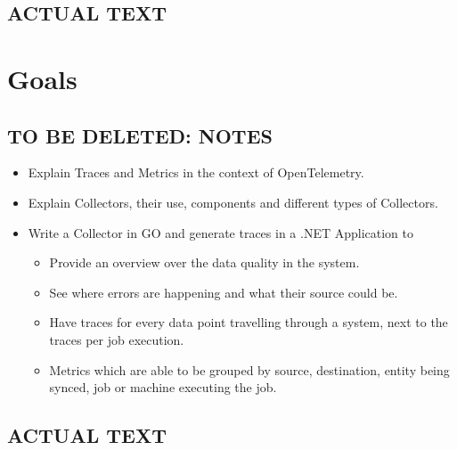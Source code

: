 \subsection{ACTUAL TEXT}

\section{Goals}

\subsection{TO BE DELETED: NOTES}

\begin{itemize}
	\item Explain Traces and Metrics in the context of OpenTelemetry.
	\item Explain Collectors, their use, components and different types of Collectors.
	\item Write a Collector in GO and generate traces in a .NET Application to
	      \begin{itemize}
		      \item Provide an overview over the data quality in the system.
		      \item See where errors are happening and what their source could be.
		      \item Have traces for every data point travelling through a system, next to the traces per job execution.
		      \item Metrics which are able to be grouped by source, destination, entity being synced, job or machine executing the job.
	      \end{itemize}
\end{itemize}

\subsection{ACTUAL TEXT}
